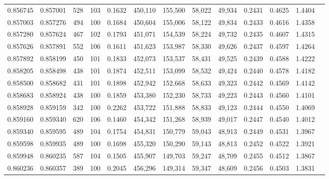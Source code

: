 \begin{tabular}{rrrrrrrrrrrrr}
0.856745 & 0.857001 &   528 & 103 &                                     0.1632 & 450,110 & 155,500 &  58,022 &  49,934 & 0.2431 & 0.4625 & 1.4404 \\
0.857003 & 0.857276 &   494 & 100 &                                     0.1684 & 450,604 & 155,006 &  58,122 &  49,834 & 0.2433 & 0.4616 & 1.4358 \\
0.857280 & 0.857624 &   467 & 102 &                                     0.1793 & 451,071 & 154,539 &  58,224 &  49,732 & 0.2435 & 0.4607 & 1.4315 \\
0.857626 & 0.857891 &   552 & 106 &                                     0.1611 & 451,623 & 153,987 &  58,330 &  49,626 & 0.2437 & 0.4597 & 1.4264 \\
0.857892 & 0.858199 &   450 & 101 &                                     0.1833 & 452,073 & 153,537 &  58,431 &  49,525 & 0.2439 & 0.4588 & 1.4222 \\
0.858205 & 0.858498 &   438 & 101 &                                     0.1874 & 452,511 & 153,099 &  58,532 &  49,424 & 0.2440 & 0.4578 & 1.4182 \\
0.858500 & 0.858682 &   431 & 101 &                                     0.1898 & 452,942 & 152,668 &  58,633 &  49,323 & 0.2442 & 0.4569 & 1.4142 \\
0.858683 & 0.858924 &   438 & 100 &                                     0.1859 & 453,380 & 152,230 &  58,733 &  49,223 & 0.2443 & 0.4560 & 1.4101 \\
0.858928 & 0.859159 &   342 & 100 &                                     0.2262 & 453,722 & 151,888 &  58,833 &  49,123 & 0.2444 & 0.4550 & 1.4069 \\
0.859160 & 0.859340 &   620 & 106 &                                     0.1460 & 454,342 & 151,268 &  58,939 &  49,017 & 0.2447 & 0.4540 & 1.4012 \\
0.859340 & 0.859595 &   489 & 104 &                                     0.1754 & 454,831 & 150,779 &  59,043 &  48,913 & 0.2449 & 0.4531 & 1.3967 \\
0.859598 & 0.859935 &   489 & 100 &                                     0.1698 & 455,320 & 150,290 &  59,143 &  48,813 & 0.2452 & 0.4522 & 1.3921 \\
0.859948 & 0.860235 &   587 & 104 &                                     0.1505 & 455,907 & 149,703 &  59,247 &  48,709 & 0.2455 & 0.4512 & 1.3867 \\
0.860236 & 0.860357 &   389 & 100 &                                     0.2045 & 456,296 & 149,314 &  59,347 &  48,609 & 0.2456 & 0.4503 & 1.3831 \\

\end{tabular}
